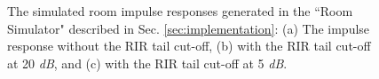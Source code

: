 \documentclass{article}
\begin{document}
\begin{figure}%
  \begin{center}
    \vspace{-5mm}
    \\
    \vspace{-5mm}
    \\
    \caption {
      The simulated room impulse responses generated in the
      ``Room Simulator" described in Sec. \ref{sec:implementation}:
      (a) The impulse response without the RIR tail cut-off,
      (b) with the RIR tail cut-off at 20 \textit{dB},
      and (c) with the RIR tail cut-off at 5 \textit{dB}.
    }
   \vspace{-7mm}
  \label{fig:rir_cutoff}
  \end{center}
\end{figure}
%
%
\end{document}
